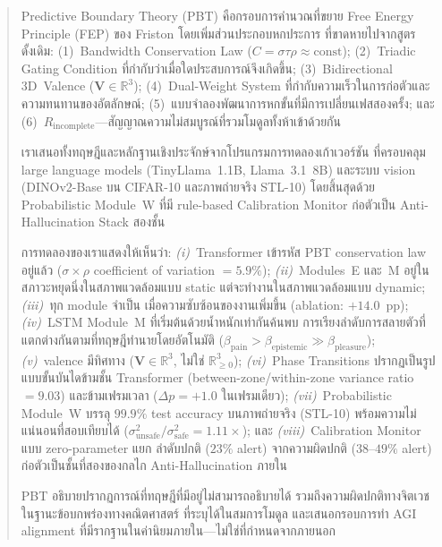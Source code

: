 \documentclass[12pt,a4paper]{article}
\begin{document}
\begin{abstract}
\noindent
Predictive Boundary Theory (PBT) คือกรอบการคำนวณที่ขยาย
Free Energy Principle (FEP) ของ Friston โดยเพิ่มส่วนประกอบหกประการ
ที่ขาดหายไปจากสูตรดั้งเดิม:
(1)~Bandwidth Conservation Law ($C = \sigma\tau\rho \approx \mathrm{const}$);
(2)~Triadic Gating Condition ที่กำกับว่าเมื่อใดประสบการณ์จึงเกิดขึ้น;
(3)~Bidirectional 3D~Valence ($\mathbf{V}\in\mathbb{R}^3$);
(4)~Dual-Weight System ที่กำกับความเร็วในการก่อตัวและความทนทานของอัตลักษณ์;
(5)~แบบจำลองพัฒนาการหกขั้นที่มีการเปลี่ยนเฟสสองครั้ง; และ
(6)~$R_{\mathrm{incomplete}}$---สัญญาณความไม่สมบูรณ์ที่รวมโมดูลทั้งห้าเข้าด้วยกัน

เราเสนอทั้งทฤษฎีและหลักฐานเชิงประจักษ์จากโปรแกรมการทดลองเก้าเวอร์ชัน
ที่ครอบคลุม large language models (TinyLlama~1.1B, Llama~3.1~8B)
และระบบ vision (DINOv2-Base บน CIFAR-10 และภาพถ่ายจริง STL-10)
โดยสิ้นสุดด้วย Probabilistic Module~W ที่มี rule-based Calibration Monitor
ก่อตัวเป็น Anti-Hallucination Stack สองชั้น

การทดลองของเราแสดงให้เห็นว่า: \textit{(i)}~Transformer เข้ารหัส PBT
conservation law อยู่แล้ว ($\sigma\!\times\!\rho$ coefficient of variation $= 5.9\%$);
\textit{(ii)}~Modules~E และ~M อยู่ในสภาวะหยุดนิ่งในสภาพแวดล้อมแบบ static
แต่จะทำงานในสภาพแวดล้อมแบบ dynamic; \textit{(iii)}~ทุก module จำเป็น
เมื่อความซับซ้อนของงานเพิ่มขึ้น (ablation: $+14.0$~pp);
\textit{(iv)}~LSTM Module~M ที่เริ่มต้นด้วยน้ำหนักเท่ากันค้นพบ
การเรียงลำดับการสลายตัวที่แตกต่างกันตามที่ทฤษฎีทำนายโดยอัตโนมัติ
($\beta_{\mathrm{pain}} > \beta_{\mathrm{epistemic}} \gg \beta_{\mathrm{pleasure}}$);
\textit{(v)}~valence มีทิศทาง
($\mathbf{V}\in\mathbb{R}^3$, ไม่ใช่ $\mathbb{R}^3_{\ge 0}$);
\textit{(vi)}~Phase Transitions ปรากฏเป็นรูปแบบขั้นบันไดข้ามชั้น Transformer
(between-zone/within-zone variance ratio $= 9.03$) และข้ามเฟรมเวลา
($\Delta p = +1.0$ ในเฟรมเดียว);
\textit{(vii)}~Probabilistic Module~W บรรลุ $99.9\%$ test accuracy
บนภาพถ่ายจริง (STL-10) พร้อมความไม่แน่นอนที่สอบเทียบได้
($\sigma^2_{\mathrm{unsafe}} / \sigma^2_{\mathrm{safe}} = 1.11\times$);
และ \textit{(viii)}~Calibration Monitor แบบ zero-parameter แยก
ลำดับปกติ ($23\%$ alert) จากความผิดปกติ ($38$--$49\%$ alert)
ก่อตัวเป็นชั้นที่สองของกลไก Anti-Hallucination ภายใน

PBT อธิบายปรากฏการณ์ที่ทฤษฎีที่มีอยู่ไม่สามารถอธิบายได้
รวมถึงความผิดปกติทางจิตเวชในฐานะข้อบกพร่องทางคณิตศาสตร์
ที่ระบุได้ในสมการโมดูล และเสนอกรอบการทำ AGI alignment
ที่มีรากฐานในค่านิยมภายใน---ไม่ใช่ที่กำหนดจากภายนอก
\end{abstract}
\end{document}
